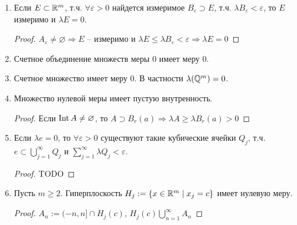 \begin{enumerate}
\begin{proof}
        $\lambda (B\setminus A)\leq \lambda (B_{\frac{1}{n}}\setminus A_{\frac{1}{n}})<\frac{1}{n}\Rightarrow \lambda (B\setminus A) = 0$

        $E\setminus A\subset B\setminus A\Rightarrow \lambda (E\setminus A)=0$ и $E\setminus A$ измеримо
        $\Rightarrow E= A\cup E\setminus A$ – измеримо
    \end{proof}

    \begin{remark}
        Свойство 5 верно для любой полной меры.
    \end{remark}

    \item Если $E\subset \mathbb{R}^m$, т.ч. $\forall \varepsilon > 0$ найдется измеримое
    $B_\varepsilon\supset E$, т.ч. $\lambda B_\varepsilon< \varepsilon$, то $E$ измеримо и $\lambda E = 0$.

    \begin{proof}
        $A_\varepsilon \not = \varnothing\Rightarrow E$ – измеримо и $\lambda E\leq \lambda B_\varepsilon < \varepsilon
        \Rightarrow \lambda E = 0$
    \end{proof}

    \item Счетное объединение множеств меры 0 имеет меру 0.
    \item Счетное множество имеет меру 0. В частности $\lambda (\mathbb{Q}^m)=0$.
    \item Множество нулевой меры имеет пустую внутренность.
    
    \begin{proof}
        Если $\operatorname{Int} A\not = \varnothing$, то $A\supset B_r (a)\Rightarrow \lambda A \geq \lambda B_r(a)>0$
    \end{proof}
    \item Если $\lambda e = 0$, то $\forall \varepsilon > 0$ существуют такие кубические ячейки $Q_j$, 
    т.ч. $e\subset \bigcup\limits_{j=1}^\infty Q_j$ и $\sum\limits_{j=1}^\infty \lambda Q_j< \varepsilon$.

    \begin{proof}
        TODO
    \end{proof}

    \item Пусть $m\geq 2$. Гиперплоскость $H_j:= \{x\in \mathbb{R}^m\mid x_j =c\}$ имеет нулевую меру.
    
    \begin{proof}
        $A_n:=(-n, n]\cap H_j(c)$, $H_j(c) \bigcup\limits_{n=1}^\infty A_n$


\end{proof}
\end{enumerate}
